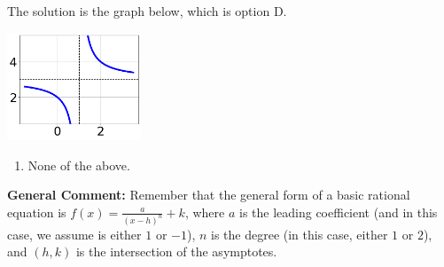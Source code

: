 \documentclass{extbook}[14pt]
\begin{document}
\begin{enumerate}
{The solution is the graph below, which is option D.
\begin{center}
    \includegraphics[width=0.3\textwidth]{../Figures/rationalEquationToGraphDB.png}
\end{center}\begin{enumerate}[label=\Alph*.]
\item None of the above.\end{enumerate}
\textbf{General Comment:} Remember that the general form of a basic rational equation is $ f(x) = \frac{a}{(x-h)^n} + k$, where $a$ is the leading coefficient (and in this case, we assume is either $1$ or $-1$), $n$ is the degree (in this case, either $1$ or $2$), and $(h, k)$ is the intersection of the asymptotes.
}
\end{enumerate}
\end{document}
